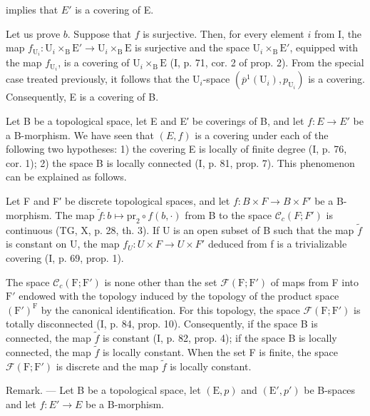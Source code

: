 implies that \(E'\) is a covering of E.

Let us prove \(b\). Suppose that \(f\) is surjective. Then, for every element \(i\) from I, the map \(f_{\mathrm{U}_i}\colon \mathrm{U}_i\times_{\mathrm{B}}\mathrm{E}'\to \mathrm{U}_i\times_{\mathrm{B}}\mathrm{E}\) is surjective and the space \(\mathrm{U}_i\times_{\mathrm{B}}\mathrm{E}'\), equipped with the map \(f_{\mathrm{U}_i}\), is a covering of \(\mathrm{U}_i\times_{\mathrm{B}}\mathrm{E}\) (I, p. 71, cor. 2 of prop. 2). From the special case treated previously, it follows that the \(\mathrm{U}_i\)-space \((\overline{p}^{1}(\mathrm{U}_{i}),p_{\mathrm{U}_{i}})\) is a covering. Consequently, E is a covering of B.

Let B be a topological space, let E and E′ be coverings of B, and let \(f: E \rightarrow E'\) be a B-morphism. We have seen that \((E, f)\) is a covering under each of the following two hypotheses: 1) the covering E is locally of finite degree (I, p. 76, cor. 1); 2) the space B is locally connected (I, p. 81, prop. 7). This phenomenon can be explained as follows.

Let F and F′ be discrete topological spaces, and let \(f: B \times F \to B \times F'\) be a B-morphism. The map \(\widetilde{f}: b \mapsto \mathrm{pr}_{2} \circ f(b, \cdot)\) from B to the space \(\mathcal{C}_{c}(F; F')\) is continuous (TG, X, p. 28, th. 3). If U is an open subset of B such that the map \(\widetilde{f}\) is constant on U, the map \(f_{U}: U \times F \to U \times F'\) deduced from f is a trivializable covering (I, p. 69, prop. 1).

The space \(\mathcal{C}_c(\mathrm{F};\mathrm{F}')\) is none other than the set \(\mathcal{F}(\mathrm{F};\mathrm{F}')\) of maps from F into \(\mathrm{F}'\) endowed with the topology induced by the topology of the product space \((\mathrm{F}')^{\mathrm{F}}\) by the canonical identification. For this topology, the space \(\mathcal{F}(\mathrm{F};\mathrm{F}')\) is totally disconnected (I, p. 84, prop. 10). Consequently, if the space B is connected, the map \(\widetilde{f}\) is constant (I, p. 82, prop. 4); if the space B is locally connected, the map \(\widetilde{f}\) is locally constant. When the set F is finite, the space \(\mathcal{F}(\mathrm{F};\mathrm{F}')\) is discrete and the map \(\widetilde{f}\) is locally constant.

Remark. --- Let B be a topological space, let \((\mathrm{E}, p)\) and \((\mathrm{E}', p')\) be B-spaces and let \(f: E' \to E\) be a B-morphism.

